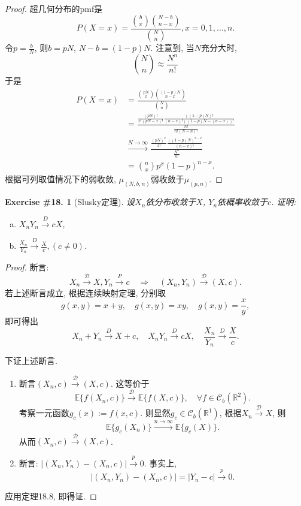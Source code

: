 \documentclass[UTF8, a4paper]{article}
\newtheorem{exercise}{Exercise \#18.}
\begin{document}
\begin{proof}
超几何分布的pmf是
$$
P(X = x) = \frac{\binom{b}{x}\binom{N-b}{n-x}}{\binom{N}{n}}, x = 0,1,...,n.
$$
令\(p = \frac{b}{N}\), 则\(b = pN\), \(N-b = (1-p)N\).
注意到, 当\(N\)充分大时, 
$$
\binom{N}{n} \approx \frac{N^n}{n!}
$$
于是
$$
\begin{aligned}
P(X = x) &= \frac{\binom{pN}{x}\binom{(1-p)N}{n-x}}{\binom{N}{n}} \\
&= \frac{\frac{(pN)!}{x!(pN-x)!}\frac{((1-p)N)!}{(n-x)!((1-p)N-(n-x))!}}{\frac{N!}{n!(N-n)!}} \\
&\xrightarrow{N\to\infty} \frac{\frac{(pN)^x}{x!}\frac{((1-p)N)^{n-x}}{(n-x)!}}{\frac{N^n}{n!}} \\
&= \binom{n}{x}p^x(1-p)^{n-x}.
\end{aligned}
$$
根据可列取值情况下的弱收敛, \(\mu_{(N,b,n)}\)弱收敛于\(\mu_{(p,n)}\).
\end{proof}
 


\begin{framed}
\begin{exercise}[Slusky定理]
设\(X_n\)依分布收敛于\(X\), \(Y_n\)依概率收敛于\(c\). 证明: 
\begin{enumerate}[(a)]
\item \(X_nY_n \xrightarrow{D} cX\),
\item \(\frac{X_n}{Y_n} \xrightarrow{D} \frac{X}{c}, (c \neq 0)\).
\end{enumerate}
\end{exercise}
\end{framed}


\begin{proof}
断言:
$$
X_n \xrightarrow{\mathcal{D}} X, Y_n \xrightarrow{P} c \quad \Rightarrow \quad (X_n, Y_n) \xrightarrow{\mathcal{D}} (X, c).
$$
若上述断言成立, 根据连续映射定理, 分别取
$$
g(x,y) = x + y, \quad g(x,y) = xy, \quad g(x,y) = \frac{x}{y},
$$
即可得出
$$
X_n + Y_n \xrightarrow{D} X + c, \quad X_nY_n \xrightarrow{D} cX, \quad \frac{X_n}{Y_n} \xrightarrow{D} \frac{X}{c}.
$$

下证上述断言.
\begin{enumerate}[Step 1]
    \item 断言\((X_n, c) \xrightarrow{\mathcal{D}} (X,c)\). 这等价于$$
    \mathbb{E}\{f(X_n, c)\} \xrightarrow{\mathcal{D}} \mathbb{E}\{f(X, c)\}, \quad \forall f \in \mathscr{C}_b(\mathbb{R}^2).
    $$
    考察一元函数\(g_c(x) := f(x, c)\). 则显然\(g_c \in \mathscr{C}_b(\mathbb{R}^1)\), 根据\(X_n \xrightarrow{\mathcal{D}} X\), 则
    $$
    \mathbb{E}\{g_c(X_n)\} \xrightarrow{n\to\infty} \mathbb{E}\{g_c(X)\}.
    $$
    从而\((X_n, c) \xrightarrow{\mathcal{D}} (X,c)\).
    \item 断言: \(|(X_n, Y_n) - (X_n, c)| \xrightarrow{p} 0\). 事实上, $$
    |(X_n, Y_n) - (X_n, c)| = |Y_n - c| \xrightarrow{p} 0.
    $$
\end{enumerate}
应用定理18.8, 即得证.
\end{proof}
\end{document}
